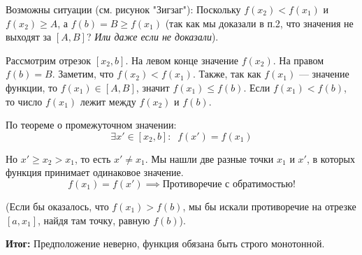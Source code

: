 \begin{tcolorbox}[title=Доказательство, breakable]
\begin{enumerate}
        Возможны ситуации (см. рисунок "Зигзаг"):
        Поскольку $f(x_2) < f(x_1)$ и $f(x_2) \ge A$, а $f(b) = B \ge f(x_1)$ (так как мы доказали в п.2, что значения не выходят за $[A, B]$? \textit{Или даже если не доказали}).
        
        Рассмотрим отрезок $[x_2, b]$.
        На левом конце значение $f(x_2)$. На правом $f(b) = B$.
        Заметим, что $f(x_2) < f(x_1)$.
        Также, так как $f(x_1)$ — значение функции, то $f(x_1) \in [A, B]$, значит $f(x_1) \le f(b)$.
        Если $f(x_1) < f(b)$, то число $f(x_1)$ лежит между $f(x_2)$ и $f(b)$.
        
        По теореме о промежуточном значении:
        \[ \exists x' \in [x_2, b]: \;\; f(x') = f(x_1) \]
        
        Но $x' \ge x_2 > x_1$, то есть $x' \neq x_1$.
        Мы нашли две разные точки $x_1$ и $x'$, в которых функция принимает одинаковое значение.
        \[ f(x_1) = f(x') \implies \text{Противоречие с обратимостью!} \]
        
        (Если бы оказалось, что $f(x_1) > f(b)$, мы бы искали противоречие на отрезке $[a, x_1]$, найдя там точку, равную $f(b)$).
        
        \begin{center}
        \end{center}
    \end{enumerate}
    \textbf{Итог:} Предположение неверно, функция обязана быть строго монотонной.
\end{tcolorbox}
